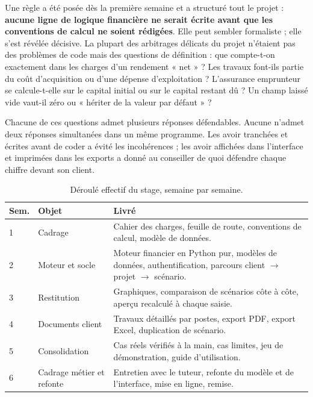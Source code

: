 \documentclass[12pt,a4paper]{article}
\begin{document}
Une règle a été posée dès la première semaine et a structuré tout le
projet : \textbf{aucune ligne de logique financière ne serait écrite avant que
	les conventions de calcul ne soient rédigées}. Elle peut sembler formaliste ;
elle s'est révélée décisive. La plupart des arbitrages délicats du projet
n'étaient pas des problèmes de code mais des questions de définition : que
compte-t-on exactement dans les charges d'un rendement « net » ? Les travaux
font-ils partie du coût d'acquisition ou d'une dépense d'exploitation ?
L'assurance emprunteur se calcule-t-elle sur le capital initial ou sur le capital
restant dû ? Un champ laissé vide vaut-il zéro ou « hériter de la valeur par
défaut » ?

Chacune de ces questions admet plusieurs réponses défendables. Aucune n'admet
deux réponses simultanées dans un même programme. Les avoir tranchées et écrites
avant de coder a évité les incohérences ; les avoir affichées dans l'interface et
imprimées dans les exports a donné au conseiller de quoi défendre chaque chiffre
devant son client.

\begin{table}[H]
	\centering
	\small
	\renewcommand{\arraystretch}{1.40}
	\begin{tabular}{|>{\centering\arraybackslash}p{1.2cm}|>{\raggedright\arraybackslash}p{4.6cm}|>{\raggedright\arraybackslash}p{8.6cm}|}
		\hline
		\rowcolor{eccblue!15}
		\textbf{\color{eccblue}Sem.} & \textbf{\color{eccblue}Objet} &
		\textbf{\color{eccblue}Livré} \\
		\hline
		\rowcolor{white}
		1 & Cadrage & Cahier des charges, feuille de route, conventions de calcul,
		modèle de données. \\
		\hline
		\rowcolor{gray!8}
		2 & Moteur et socle & Moteur financier en Python pur, modèles de données,
		authentification, parcours client $\rightarrow$ projet $\rightarrow$ scénario. \\
		\hline
		\rowcolor{white}
		3 & Restitution & Graphiques, comparaison de scénarios côte à côte,
		aperçu recalculé à chaque saisie. \\
		\hline
		\rowcolor{gray!8}
		4 & Documents client & Travaux détaillés par postes, export PDF, export
		Excel, duplication de scénario. \\
		\hline
		\rowcolor{white}
		5 & Consolidation & Cas réels vérifiés à la main, cas limites, jeu de
		démonstration, guide d'utilisation. \\
		\hline
		\rowcolor{gray!8}
		6 & Cadrage métier et refonte & Entretien avec le tuteur, refonte du
		modèle et de l'interface, mise en ligne, remise. \\
		\hline
	\end{tabular}
	\caption{Déroulé effectif du stage, semaine par semaine.}
\end{table}
\end{document}
